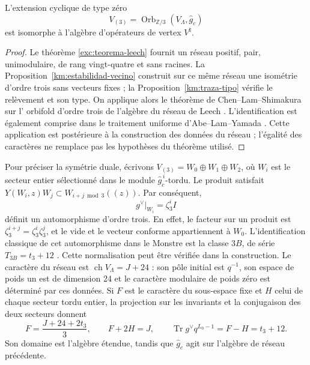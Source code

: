 \begin{theorem}
\label{km:moonshine-tres}
L'extension cyclique de type zéro
\begin{equation}
 V_{(3)}=\operatorname{Orb}_{\mathbb Z/3}
                 (V_\Lambda,\widehat g_c)
 \label{km:extension-orden3}
\end{equation}
est isomorphe à l'algèbre d'opérateurs de vertex \(V^\natural\).
\end{theorem}
\begin{proof}
Le théorème \ref{exc:teorema-leech} fournit un réseau positif,
pair, unimodulaire, de rang vingt-quatre et sans racines. La
Proposition~\ref{km:estabilidad-vecino} construit sur ce même
réseau une isométrie d'ordre trois sans vecteurs fixes ; la
Proposition~\ref{km:traza-tipo} vérifie le relèvement et son type.
On applique alors le théorème de Chen--Lam--Shimakura sur l'
orbifold d'ordre trois de l'algèbre du réseau de Leech
\cite{chenlamshimakura2016}. L'identification est également comprise
dans le traitement uniforme d'Abe--Lam--Yamada
\cite{abelamyamada2017}. Cette application est postérieure à la construction
des données du réseau ; l'égalité des caractères ne remplace pas les
hypothèses du théorème utilisé.
\end{proof}

Pour préciser la symétrie duale, écrivons \(V_{(3)}=W_0\oplus W_1\oplus W_2\), où \(W_i\) est le secteur entier sélectionné dans le module \(\widehat g_c^{\,i}\)-tordu. Le produit satisfait \(Y(W_i,z)W_j\subset W_{i+j\bmod3}((z))\). Par conséquent,
\begin{equation}
 g^\vee|_{W_i}=\zeta_3^i I
 \label{km:dual-ciclico}
\end{equation}
définit un automorphisme d'ordre trois. En effet, le facteur sur un
produit est \(\zeta_3^{i+j}=\zeta_3^i\zeta_3^j\), et le vide et le
vecteur conforme appartiennent à \(W_0\). L'identification classique de
cet automorphisme dans le Monstre est la classe \(3B\), de série
\(T_{3B}=t_3+12\) \cite{kmconwaynorton1979,borcherds}.
Cette normalisation peut être vérifiée dans la construction. Le caractère
du réseau est \(\operatorname{ch}V_\Lambda=J+24\) : son pôle initial
est \(q^{-1}\), son espace de poids un est de dimension 24 et le
caractère modulaire de poids zéro est déterminé par ces données.
Si \(F\) est le caractère du sous-espace fixe et \(H\) celui de chaque
secteur tordu entier, la projection sur les invariants et la conjugaison
des deux secteurs donnent
\[
 F=\frac{J+24+2t_3}{3},\qquad F+2H=J,
 \qquad \operatorname{Tr}g^\vee q^{L_0-1}=F-H=t_3+12.
\]
Son domaine est l'algèbre étendue, tandis que \(\widehat g_c\) agit sur l'algèbre de réseau précédente.

